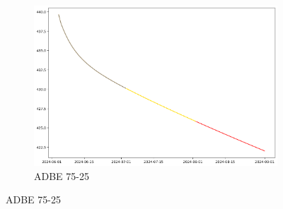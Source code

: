 \documentclass{ieeeojies}
\begin{document}
\begin{figure}[H]
\begin{subfigure}[b]{0.33\linewidth}
        \centering
        \includegraphics[width=\linewidth]{GRU Plot/GRU_ADBE_75_25_90days.png}
        \caption{ADBE 75-25}
        \label{fig:adbe-75-25}
    \end{subfigure}
\end{figure}
\vspace{-20pt}
\end{document}
